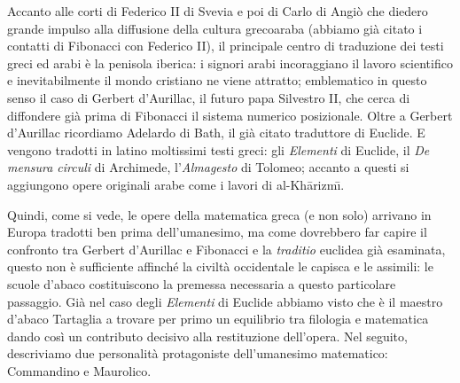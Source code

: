 \par Accanto alle corti di Federico II di Svevia e poi di Carlo di Angi\`o che diedero grande impulso alla diffusione della cultura grecoaraba (abbiamo gi\`a citato i contatti di Fibonacci con Federico II), il principale centro di traduzione dei testi greci ed arabi \`e la penisola iberica: i signori arabi incoraggiano il lavoro scientifico e inevitabilmente il mondo cristiano ne viene attratto; emblematico in questo senso il caso di Gerbert d'Aurillac, il futuro papa Silvestro II, che cerca di diffondere gi\`a prima di Fibonacci il sistema numerico posizionale. Oltre a Gerbert d'Aurillac ricordiamo Adelardo di Bath, il gi\`a citato traduttore di Euclide. E vengono tradotti in latino moltissimi testi greci: gli \textit{Elementi} di Euclide, il \textit{De mensura circuli} di Archimede, l'\textit{Almagesto} di Tolomeo; accanto a questi si aggiungono opere originali arabe come i lavori di al-Kh\=arizm\={\i}.
\par Quindi, come si vede, le opere della matematica greca (e non solo) arrivano in Europa tradotti ben prima dell'umanesimo, ma come dovrebbero far capire il confronto tra Gerbert d'Aurillac e Fibonacci e la \textit{traditio} euclidea gi\`a esaminata, questo non \`e sufficiente affinch\'e la civilt\`a occidentale le capisca e le assimili: le scuole d'abaco costituiscono la premessa necessaria a questo particolare passaggio. Gi\`a nel caso degli \textit{Elementi} di Euclide abbiamo visto che \`e il maestro d'abaco Tartaglia a trovare per primo un equilibrio tra filologia e matematica dando cos\`i un contributo decisivo alla restituzione dell'opera. Nel seguito, descriviamo due personalit\`a protagoniste dell'umanesimo matematico: Commandino e Maurolico.

